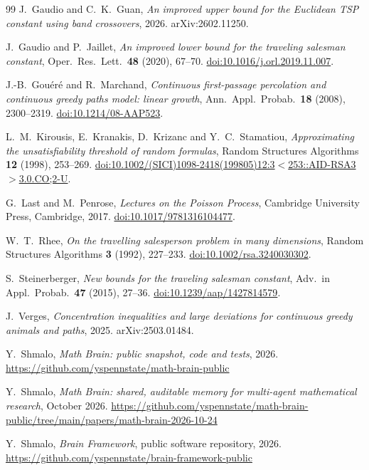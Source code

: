 \documentclass[11pt]{article}
\theoremstyle{remark}
\providecommand{\doi}[1]{\href{https://doi.org/#1}{doi:#1}}
\begin{document}
\begin{thebibliography}{99}
J.~Gaudio and C.~K.~Guan, \emph{An improved upper bound for the Euclidean TSP constant using band crossovers}, 2026.
arXiv:2602.11250.

J.~Gaudio and P.~Jaillet, \emph{An improved lower bound for the traveling salesman constant}, Oper.\ Res.\ Lett.\
\textbf{48} (2020), 67--70. \doi{10.1016/j.orl.2019.11.007}.

J.-B.~Gou\'er\'e and R.~Marchand, \emph{Continuous first-passage percolation and continuous greedy paths model: linear
growth}, Ann.\ Appl.\ Probab.\ \textbf{18} (2008), 2300--2319. \doi{10.1214/08-AAP523}.

L.~M.~Kirousis, E.~Kranakis, D.~Krizanc and Y.~C.~Stamatiou, \emph{Approximating the unsatisfiability threshold of
random formulas}, Random Structures Algorithms \textbf{12} (1998), 253--269.
\href{https://doi.org/10.1002/(SICI)1098-2418(199805)12:3<253::AID-RSA3>3.0.CO;2-U}{doi:10.1002/(SICI)1098-2418(199805)12:3$<$253::AID-RSA3$>$3.0.CO;2-U}.

G.~Last and M.~Penrose, \emph{Lectures on the Poisson Process}, Cambridge University Press, Cambridge, 2017. \doi{10.1017/9781316104477}.

W.~T.~Rhee, \emph{On the travelling salesperson problem in many dimensions}, Random Structures Algorithms \textbf{3}
(1992), 227--233. \doi{10.1002/rsa.3240030302}.

S.~Steinerberger, \emph{New bounds for the traveling salesman constant}, Adv.\ in Appl.\ Probab.\ \textbf{47} (2015),
27--36. \doi{10.1239/aap/1427814579}.

J.~Verges, \emph{Concentration inequalities and large deviations for continuous greedy animals and paths}, 2025.
arXiv:2503.01484.

Y.~Shmalo, \emph{Math Brain: public snapshot, code and tests}, 2026.
\url{https://github.com/yspennstate/math-brain-public}

Y.~Shmalo, \emph{Math Brain: shared, auditable memory for multi-agent mathematical research}, October 2026.
\url{https://github.com/yspennstate/math-brain-public/tree/main/papers/math-brain-2026-10-24}

Y.~Shmalo, \emph{Brain Framework}, public software repository, 2026.
\url{https://github.com/yspennstate/brain-framework-public}

\end{thebibliography}
\end{document}
